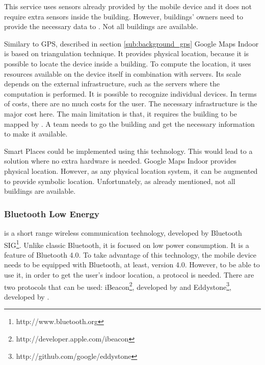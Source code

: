 This service uses sensors already provided by the mobile device and it does not require extra sensors inside the building.
However, buildings' owners need to provide the necessary data to .
Not all buildings are available.

Similary to \gls{GPS}, described in section \ref{sub:background_gps} Google Maps Indoor is based on triangulation technique.
It provides physical location, because it is possible to locate the device inside a building.
To compute the location, it uses resources available on the device itself in combination with servers.
Its scale depends on the external infrastructure, such as the servers where the computation is performed.
It is possible to recognize individual devices.
In terms of costs, there are no much costs for the user. The necessary infrastructure is the major cost here.
The main limitation is that, it requires the building to be mapped by . A team needs to go the building and get the necessary information to make it available.

Smart Places could be implemented using this technology.
This would lead to a solution where no extra hardware is needed.
Google Maps Indoor provides physical location. However, as any physical location system, it can be augmented to provide symbolic location.
Unfortunately, as already mentioned, not all buildings are available.

\subsubsection{Bluetooth Low Energy}
\label{sub:background_bluetooth_low_energy}
\cite{ble} is a short range wireless communication technology, developed by Bluetooth \gls{SIG}\footnote{http://www.bluetooth.org}.
Unlike classic Bluetooth, it is focused on low power consumption.
It is a feature of Bluetooth 4.0\cite{bluetooth_specification}.
To take advantage of this technology, the mobile device needs to be equipped with Bluetooth, at least, version 4.0.
However, to be able to use it, in order to get the user's indoor location, a protocol is needed.
There are two protocols that can be used: iBeacon\footnote{http://developer.apple.com/ibeacon}, developed by  and Eddystone\footnote{http://github.com/google/eddystone}, developed by .

